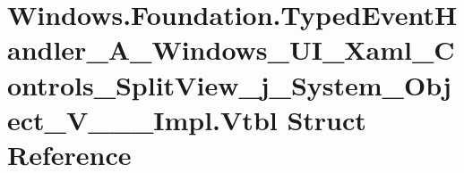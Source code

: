 \hypertarget{struct_windows_1_1_foundation_1_1_typed_event_handler___a___windows___u_i___xaml___controls___spbe6956be4b8dd5e753952ceff0bf2f92}{}\section{Windows.\+Foundation.\+Typed\+Event\+Handler\+\_\+\+A\+\_\+\+Windows\+\_\+\+U\+I\+\_\+\+Xaml\+\_\+\+Controls\+\_\+\+Split\+View\+\_\+j\+\_\+\+System\+\_\+\+Object\+\_\+\+V\+\_\+\+\_\+\+\_\+\+Impl.\+Vtbl Struct Reference}
\label{struct_windows_1_1_foundation_1_1_typed_event_handler___a___windows___u_i___xaml___controls___spbe6956be4b8dd5e753952ceff0bf2f92}
